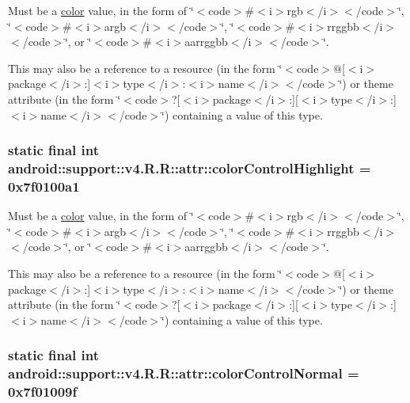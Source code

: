 Must be a \hyperlink{classandroid_1_1support_1_1v4_1_1_r_1_1color}{color} value, in the form of \char`\"{}$<$code$>$\#$<$i$>$rgb$<$/i$>$$<$/code$>$\char`\"{}, \char`\"{}$<$code$>$\#$<$i$>$argb$<$/i$>$$<$/code$>$\char`\"{}, \char`\"{}$<$code$>$\#$<$i$>$rrggbb$<$/i$>$$<$/code$>$\char`\"{}, or \char`\"{}$<$code$>$\#$<$i$>$aarrggbb$<$/i$>$$<$/code$>$\char`\"{}. 

This may also be a reference to a resource (in the form \char`\"{}$<$code$>$@\mbox{[}$<$i$>$package$<$/i$>$:\mbox{]}$<$i$>$type$<$/i$>$:$<$i$>$name$<$/i$>$$<$/code$>$\char`\"{}) or theme attribute (in the form \char`\"{}$<$code$>$?\mbox{[}$<$i$>$package$<$/i$>$:\mbox{]}\mbox{[}$<$i$>$type$<$/i$>$:\mbox{]}$<$i$>$name$<$/i$>$$<$/code$>$\char`\"{}) containing a value of this type. \hypertarget{classandroid_1_1support_1_1v4_1_1_r_1_1attr_bdb2f0dd338373d836bf5ed5ba4e29ed}{
\subsubsection[{colorControlHighlight}]{\setlength{\rightskip}{0pt plus 5cm}static final int android::support::v4.R.R::attr::colorControlHighlight = 0x7f0100a1}}
\label{classandroid_1_1support_1_1v4_1_1_r_1_1attr_bdb2f0dd338373d836bf5ed5ba4e29ed}


Must be a \hyperlink{classandroid_1_1support_1_1v4_1_1_r_1_1color}{color} value, in the form of \char`\"{}$<$code$>$\#$<$i$>$rgb$<$/i$>$$<$/code$>$\char`\"{}, \char`\"{}$<$code$>$\#$<$i$>$argb$<$/i$>$$<$/code$>$\char`\"{}, \char`\"{}$<$code$>$\#$<$i$>$rrggbb$<$/i$>$$<$/code$>$\char`\"{}, or \char`\"{}$<$code$>$\#$<$i$>$aarrggbb$<$/i$>$$<$/code$>$\char`\"{}. 

This may also be a reference to a resource (in the form \char`\"{}$<$code$>$@\mbox{[}$<$i$>$package$<$/i$>$:\mbox{]}$<$i$>$type$<$/i$>$:$<$i$>$name$<$/i$>$$<$/code$>$\char`\"{}) or theme attribute (in the form \char`\"{}$<$code$>$?\mbox{[}$<$i$>$package$<$/i$>$:\mbox{]}\mbox{[}$<$i$>$type$<$/i$>$:\mbox{]}$<$i$>$name$<$/i$>$$<$/code$>$\char`\"{}) containing a value of this type. \hypertarget{classandroid_1_1support_1_1v4_1_1_r_1_1attr_a3a49678d14c0d77b8fbdd7258b75239}{
\subsubsection[{colorControlNormal}]{\setlength{\rightskip}{0pt plus 5cm}static final int android::support::v4.R.R::attr::colorControlNormal = 0x7f01009f}}
\label{classandroid_1_1support_1_1v4_1_1_r_1_1attr_a3a49678d14c0d77b8fbdd7258b75239}


